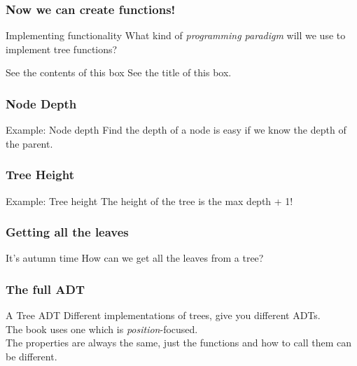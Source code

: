 \begin{frame}
	\frametitle{Now we can create functions!}
	\begin{block}{Implementing functionality}
		What kind of \textit{programming paradigm} will we use to implement tree functions?
	\end{block}
	\pause
	\begin{block}{See the contents of this box}
		See the title of this box.
	\end{block}
\end{frame}

\begin{frame}
	\frametitle{Node Depth}
		\begin{block}{Example: Node depth}
			Find the depth of a node is easy if we know the depth of the parent.
		\end{block}	
		\pause
		
\end{frame}

\begin{frame}
	\frametitle{Tree Height}
		\begin{block}{Example: Tree height}
			The height of the tree is the max depth + 1! 	
		\end{block}	
		\pause
		
\end{frame}

\begin{frame}
	\frametitle{Getting all the leaves}
	\begin{block}{It's autumn time}
		How can we get all the leaves from a tree?
	\end{block}
		\pause
		
\end{frame}

\begin{frame}
	\frametitle{The full ADT}
		\begin{block}{A Tree ADT}
			Different implementations of trees, give you different ADTs.\\
			The book uses one which is \textit{position}-focused.\\
			The properties are always the same, just the functions and how to call them can be different.
		\end{block}	
\end{frame}

